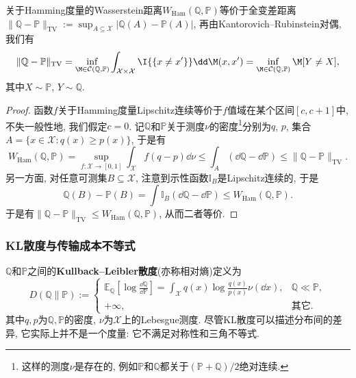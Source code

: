 \begin{example}[Hamming度量和全变差距离]\label{ex:HammingMetricAndTVDistance}
	关于Hamming度量的Wasserstein距离$W_{\text{Ham}}(\mathbb{Q}, \mathbb{P})$等价于全变差距离$\|\mathbb{Q} - \mathbb{P}\|_{\text{TV}} := \sup_{A \subseteq \mathcal{X}} |\mathbb{Q}(A) - \mathbb{P}(A)|$, 再由Kantorovich–Rubinstein对偶, 我们有
	\begin{equation*}
		\|\mathbb{Q} - \mathbb{P}\|_{\text{TV}}
		= \inf_{\M \in \mathcal{C}(\mathbb{Q}, \mathbb{P})} \int_{\mathcal{X} \times \mathcal{X}} \I{\{x \neq x'\}} \dd \M(x, x')
		= \inf_{\M \in \mathcal{C}(\mathbb{Q}, \mathbb{P})} \M[Y \neq X], 
	\end{equation*}
	其中$X \sim \mathbb{P}$, $Y \sim \mathbb{Q}$. 
	\begin{proof}
	函数$f$关于Hamming度量Lipschitz连续等价于$f$值域在某个区间$[c, c+1]$中, 不失一般性地, 我们假定$c = 0$. 
	记$\mathbb{Q}$和$\mathbb{P}$关于测度$\nu$的密度\footnote{这样的测度$\nu$是存在的, 例如$\mathbb{P}$和$\mathbb{Q}$都关于$(\mathbb{P} + \mathbb{Q})/2$绝对连续.}分别为$q$, $p$, 集合$A = \{x \in \mathcal{X} \colon q(x) \geq p(x)\} $, 于是有
	\begin{equation*}
		W_{\text{Ham}}(\mathbb{Q}, \mathbb{P})
		= \sup_{f \colon \mathcal{X} \to [0, 1]} \int_{\mathcal{X}} f (q - p) \dd \nu 
		\leq \int_A (\dd \mathbb{Q} - \dd \mathbb{P})
		\leq \|\mathbb{Q} - \mathbb{P}\|_{\text{TV}}. 
	\end{equation*}
	另一方面, 对任意可测集$B \subseteq \mathcal{X}$, 注意到示性函数$\mathbb{I}_B$是Lipschitz连续的, 于是
	\begin{equation*}
		\mathbb{Q}(B) - \mathbb{P}(B) 
		= \int \mathbb{I}_B (\dd \mathbb{Q} - \dd \mathbb{P}) 
		\leq W_{\text{Ham}}(\mathbb{Q}, \mathbb{P}). 
	\end{equation*}
	于是有$\|\mathbb{Q} - \mathbb{P}\|_{\text{TV}} \leq W_{\text{Ham}}(\mathbb{Q}, \mathbb{P})$, 从而二者等价. 
	\end{proof}
\end{example}

\subsubsection{KL散度与传输成本不等式}

 $\mathbb{Q}$和$\mathbb{P}$之间的\textbf{Kullback–Leibler散度}(亦称相对熵)定义为
\begin{equation}
	D(\mathbb{Q} \| \mathbb{P})
	:= \begin{cases}
		\mathbb{E}_{\mathbb{Q}} \left[ \log \frac{\dd \mathbb{Q}}{\dd \mathbb{P}} \right]
		= \int_{\mathcal{X}} q(x) \log \frac{q(x)}{p(x)} \nu(\dd x), & \mathbb{Q} \ll \mathbb{P}, \\
		+\infty, &\text{其它}. 
	\end{cases} 
\end{equation}
其中$q, p$为$\mathbb{Q}, \mathbb{P}$的密度, $\nu$为$\mathcal{X}$上的Lebesgue测度. 
尽管KL散度可以描述分布间的差异, 它实际上并不是一个度量: 它不满足对称性和三角不等式. 

